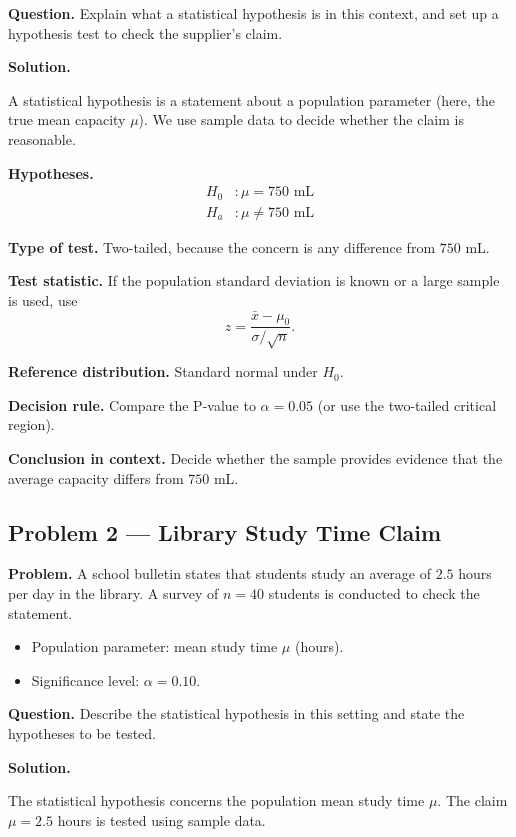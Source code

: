 	\textbf{Question.} Explain what a statistical hypothesis is in this context, and set up a hypothesis test to check the supplier's claim.
	
	\textbf{Solution.}
	
	A statistical hypothesis is a statement about a population parameter (here, the true mean capacity $\mu$). We use sample data to decide whether the claim is reasonable.
	
	\textbf{Hypotheses.}
	\[
	\begin{aligned}
		H_0&: \mu = 750 \text{ mL} \\
		H_a&: \mu \neq 750 \text{ mL}
	\end{aligned}
	\]
	
	\textbf{Type of test.} Two-tailed, because the concern is any difference from $750$ mL.
	
	\textbf{Test statistic.} If the population standard deviation is known or a large sample is used, use
	\[
	z = \frac{\bar{x}-\mu_0}{\sigma/\sqrt{n}}.
	\]
	
	\textbf{Reference distribution.} Standard normal under $H_0$.
	
	\textbf{Decision rule.} Compare the P-value to $\alpha=0.05$ (or use the two-tailed critical region).
	
	\textbf{Conclusion in context.} Decide whether the sample provides evidence that the average capacity differs from $750$ mL.
	
	\hypertarget{c1-ex2}{}
	\subsection*{Problem 2 — Library Study Time Claim}
	
	\textbf{Problem.} A school bulletin states that students study an average of $2.5$ hours per day in the library. A survey of $n=40$ students is conducted to check the statement.
	\begin{itemize}
		\item Population parameter: mean study time $\mu$ (hours).
		\item Significance level: $\alpha=0.10$.
	\end{itemize}
	
	\textbf{Question.} Describe the statistical hypothesis in this setting and state the hypotheses to be tested.
	
	\textbf{Solution.}
	
	The statistical hypothesis concerns the population mean study time $\mu$. The claim $\mu=2.5$ hours is tested using sample data.
	
